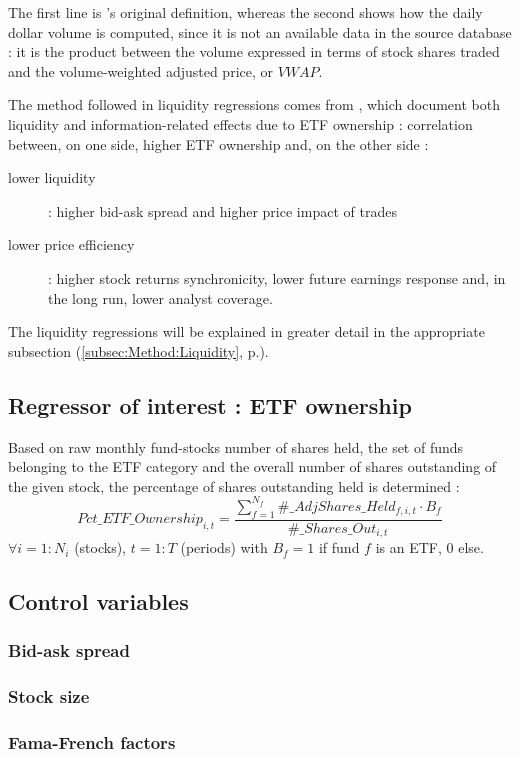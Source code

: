   The first line is \cite{Amihud2002}'s original definition, whereas the second shows how the daily dollar volume is computed, since it is not an available data in the source database : it is the product between the volume expressed in terms of stock shares traded and the volume-weighted adjusted price, or $VWAP$.
  
The method followed in liquidity regressions comes from \cite{Israeli2017}, which document both liquidity and information-related effects due to ETF ownership : correlation between, on one side, higher ETF ownership  and, on the other side :
\begin{description}
\item[lower liquidity] : higher bid-ask spread and higher price impact of trades
\item[lower price efficiency] : higher stock returns synchronicity, lower future earnings response and, in the long run, lower analyst coverage.
\end{description}

The liquidity regressions will be explained in greater detail in the appropriate subsection (\autoref{subsec:Method:Liquidity}, p.\pageref{subsec:Method:Liquidity}).
\subsection{Regressor of interest : ETF ownership}
Based on raw monthly fund-stocks number of shares held, the set of funds belonging to the ETF category and the overall number of shares outstanding of the given stock, the percentage of shares outstanding held is determined :
\begin{equation}
  Pct\_ETF\_Ownership_{i, t} = \frac{\sum_{f = 1}^{N_{f}} \#\_AdjShares\_Held_{f, i, t}\cdot B_{f}}{\#\_Shares\_Out_{i, t}}
\end{equation}
$\forall i = 1:N_{i}$ (stocks), $t = 1:T$ (periods)
with $B_{f} = 1$ if fund $f$ is an ETF, $0$ else.
\subsection{Control variables}
\subsubsection{Bid-ask spread}
\subsubsection{Stock size}
\subsubsection{Fama-French factors}
